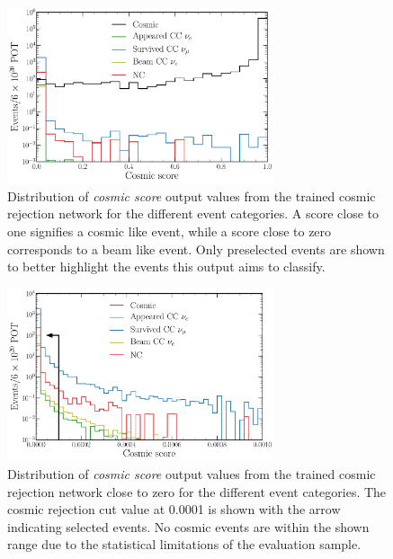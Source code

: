 \begin{figure} %
    \includegraphics[width=0.7\textwidth]{diagrams/7-results/final_cosmic_outputs.pdf}
    \caption[Distribution of cosmic score output values]
    {Distribution of \emph{cosmic score} output values from the trained cosmic rejection network
        for the different event categories. A score close to one signifies a cosmic like event,
        while a score close to zero corresponds to a beam like event. Only preselected events are
        shown to better highlight the events this output aims to classify.}
    \label{fig:cosmic_outputs}
\end{figure}

\begin{figure} %
    \includegraphics[width=0.7\textwidth]{diagrams/7-results/final_cosmic_zoomed_outputs.pdf}
    \caption[Distribution of cosmic score output values close to zero]
    {Distribution of \emph{cosmic score} output values from the trained cosmic rejection network
        close to zero for the different event categories. The cosmic rejection cut value at 0.0001
        is shown with the arrow indicating selected events. No cosmic events are within the shown
        range due to the statistical limitations of the evaluation sample.}
    \label{fig:cosmic_zoomed_outputs}
\end{figure}

